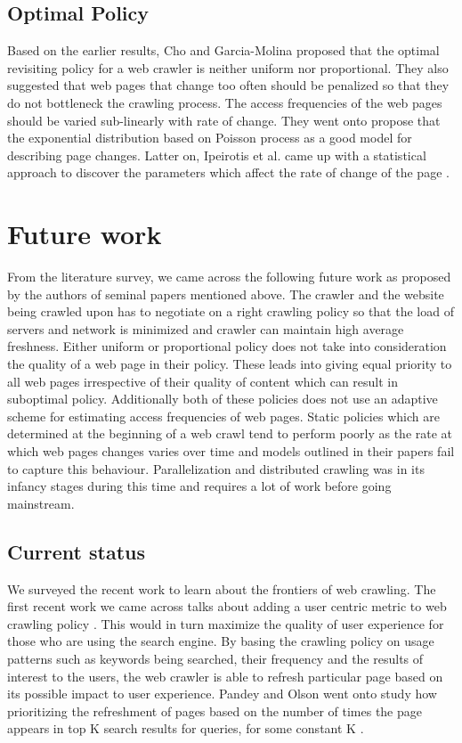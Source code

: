 \documentclass[a4paper, 11pt]{article} %
\begin{document}
\subsection{Optimal Policy}

Based on the earlier results, Cho and Garcia-Molina proposed that the optimal revisiting policy for a web crawler is neither uniform nor proportional. \cite{cho2003estimating} They also suggested that web pages that change too often should be penalized so that they do not bottleneck the crawling process. The access frequencies of the web pages should be varied sub-linearly with rate of change. They went onto propose that the exponential distribution based on Poisson process as a good model for describing page changes. Latter on, Ipeirotis et al. came up with a statistical approach to discover the parameters which affect the rate of change of the page \cite{ipeirotis2005modeling}.

\section{Future work}

From the literature survey, we came across the following future work as proposed by the authors of seminal papers mentioned above. The crawler and the website being crawled upon has to negotiate on a right crawling policy so that the load of servers and network is minimized and crawler can maintain high average freshness. Either uniform or proportional policy does not take into consideration the quality of a web page in their policy. These leads into giving equal priority to all web pages irrespective of their quality of content which can result in suboptimal policy. Additionally both of these policies does not use an adaptive scheme for estimating access frequencies of web pages. Static policies which are determined at the beginning of a web crawl tend to perform poorly as the rate at which web pages changes varies over time and models outlined in their papers fail to capture this behaviour. Parallelization and distributed crawling  was in its infancy stages during this time and requires a lot of work before going mainstream.

\subsection{Current status}

We surveyed the recent work to learn about the frontiers of web crawling. The first recent work we came across talks about adding a user centric metric to web crawling policy \cite{pandey2005user}. This would in turn maximize the quality of user experience for those who are using the search engine. By basing the crawling policy on usage patterns such as keywords being searched, their frequency and the results of interest to the users, the web crawler is able to refresh particular page based on its possible impact to user experience. Pandey and Olson went onto study how prioritizing the refreshment of pages based on the number of times the page appears in top K search results for queries, for some constant K \cite{pandey2008crawl}. \\
\end{document}
